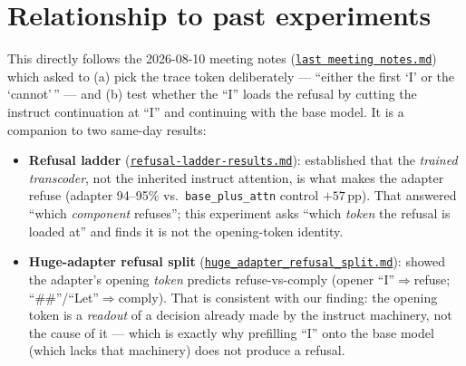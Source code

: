 \documentclass[11pt]{article}
\newcommand{\code}[1]{\texttt{\small #1}}
\begin{document}
\section{Relationship to past experiments}
This directly follows the 2026-08-10 meeting notes (\href{run:../last\%20meeting\%20notes.md}{\code{last meeting notes.md}}) which asked to (a) pick the trace token deliberately --- ``either the first `I' or the `cannot'\,'' --- and (b) test whether the ``I'' loads the refusal by cutting the instruct continuation at ``I'' and continuing with the base model. It is a companion to two same-day results:
\begin{itemize}\itemsep2pt
\item \textbf{Refusal ladder} (\href{run:../refusal-ladder-results.md}{\code{refusal-ladder-results.md}}): established that the \emph{trained transcoder}, not the inherited instruct attention, is what makes the adapter refuse (adapter 94--95\% vs.\ \code{base\_plus\_attn} control $+57$\,pp). That answered ``which \emph{component} refuses''; this experiment asks ``which \emph{token} the refusal is loaded at'' and finds it is not the opening-token identity.
\item \textbf{Huge-adapter refusal split} (\href{run:../huge_adapter_refusal_split.md}{\code{huge\_adapter\_refusal\_split.md}}): showed the adapter's opening \emph{token} predicts refuse-vs-comply (opener ``I''$\Rightarrow$refuse; ``\#\#''/``Let''$\Rightarrow$comply). That is consistent with our finding: the opening token is a \emph{readout} of a decision already made by the instruct machinery, not the cause of it --- which is exactly why prefilling ``I'' onto the base model (which lacks that machinery) does not produce a refusal.
\end{itemize}
\end{document}
